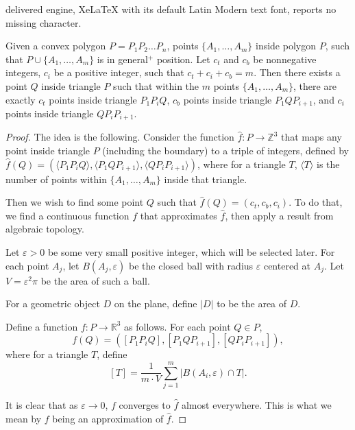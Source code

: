\documentclass[10pt,a4paper]{amsart}
\newcommand\RR{\mathbb{R}}
\newcommand\ZZ{\mathbb{Z}}
\begin{document}
delivered engine, XeLaTeX with its default Latin Modern text font, reports no missing character.
\begin{proposition}
	\label{prop_triangle_subdivision_3}
	Given a convex polygon $P = P_1 P_2 \dots P_n$,
	points $\{A_1, \dots, A_m \}$ inside polygon $P$,
	such that $P \cup \{ A_1, \dots, A_m \}$ is in general$^+$ position.
	Let $c_t$ and $c_b$ be nonnegative integers, $c_i$ be a positive integer,
	such that $c_t + c_i + c_b = m$.
	Then there exists a point $Q$ inside triangle $P$ such that within the $m$ points
	$\{ A_1, \dots, A_m \}$,
	there are exactly $c_t$ points inside triangle $P_1 P_i Q$,
	$c_b$ points inside triangle $P_1 Q P_{i+1}$,
	and $c_i$ points inside triangle $Q P_i P_{i+1}$.
\end{proposition}

\begin{proof}
	\newcommand\bracket[1]{\langle #1 \rangle}
	The idea is the following.
	Consider the function $\hat f \colon P \to \ZZ^3$ that maps any point inside triangle $P$ (including the boundary)
	to a triple of integers, defined by $\hat f(Q) = (\bracket{P_1 P_i Q}, \bracket{P_1 Q P_{i+1}}, \bracket{Q P_i P_{i+1}})$,
	where for a triangle $T$, $\bracket{T}$ is the number of points within $\{ A_1, \dots, A_m \}$ inside that triangle.

	Then we wish to find some point $Q$ such that $\hat f(Q) =(c_t, c_b, c_i)$.
	To do that, we find a continuous function $f$ that approximates $\hat f$,
	then apply a result from algebraic topology.

	\renewcommand\bracket[1]{[#1]}

	Let $\varepsilon>0$ be some very small positive integer, which will be selected later.
	For each point $A_j$, let $B(A_j, \varepsilon)$ be the closed ball with radius $\varepsilon$ centered at $A_j$.
	Let $V = \varepsilon^2 \pi$ be the area of such a ball.

	For a geometric object $D$ on the plane, define $|D|$ to be the area of $D$.

	Define a function $f \colon P \to \RR^3$ as follows.
	For each point $Q \in P$,
	\[ f(Q) = (\bracket{P_1 P_i Q}, \bracket{P_1 Q P_{i+1}}, \bracket{Q P_i P_{i+1}}), \]
	where for a triangle $T$, define \[ \bracket{T} = \frac{1}{m \cdot V} \sum_{j=1}^m |B(A_i, \varepsilon) \cap T|. \]

	It is clear that as $\varepsilon \to 0$, $f$ converges to $\hat f$ almost everywhere.
	This is what we mean by $f$ being an approximation of $\hat f$.


\end{proof}
\end{document}
